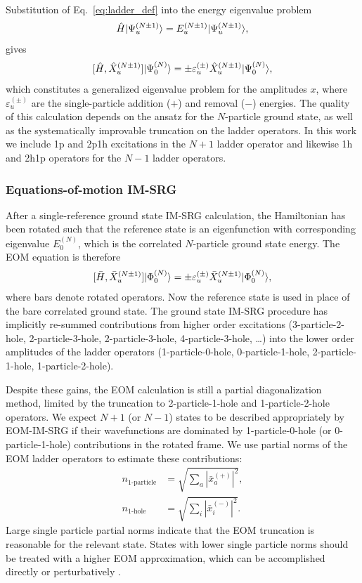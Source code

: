 Substitution of Eq.\ \eqref{eq:ladder_def} into the energy eigenvalue problem
\begin{gather*}
  \hat H | \Psi_u^{(N \pm 1)} \rangle = E^{(N\pm1)}_u | \Psi_u^{(N \pm 1)} \rangle,
\end{gather*}
gives
\begin{equation}\label{eq:EOM}
  [\hat{H}, \hat{X}^{(N \pm 1)}_u] | \Psi^{(N)}_0 \rangle = \pm \varepsilon^{(\pm)}_u \hat{X}^{(N \pm 1)}_u | \Psi^{(N)}_0 \rangle,
\end{equation}
which constitutes a generalized eigenvalue problem for the amplitudes $x$, where $\varepsilon^{(\pm)}_u$ are the single-particle addition ($+$) and removal ($-$) energies. The quality of this calculation depends on the ansatz for the $N$-particle ground state, as well as the systematically improvable truncation on the ladder operators. In this work we include 1p and 2p1h excitations in the $N + 1$ ladder operator and likewise 1h and 2h1p operators for the $N - 1$ ladder operators.

\subsubsection*{Equations-of-motion IM-SRG}

After a single-reference ground state IM-SRG calculation, the Hamiltonian has been rotated such that the reference state is an eigenfunction with corresponding eigenvalue $E^{(N)}_0$, which is the correlated $N$-particle ground state energy. The EOM equation is therefore
\begin{align} \label{eq:EOMIMSRG}
  [\bar{H},\bar{X}^{(N \pm 1)}_u] | \Phi^{(N)}_0 \rangle = \pm \varepsilon^{(\pm)}_u \bar{X}^{(N \pm 1)}_u | \Phi^{(N)}_0 \rangle,
\end{align}
where bars denote rotated operators. Now the reference state is used in place of the bare correlated ground state. The ground state IM-SRG procedure has implicitly re-summed contributions from higher order excitations (3-particle-2-hole, 2-particle-3-hole, 2-particle-3-hole, 4-particle-3-hole, \ldots) into the lower order amplitudes of the ladder operators (1-particle-0-hole, 0-particle-1-hole, 2-particle-1-hole, 1-particle-2-hole).

Despite these gains, the EOM calculation is still a partial diagonalization method, limited by the truncation to 2-particle-1-hole and 1-particle-2-hole operators. We expect $N + 1$ (or $N - 1$) states to be described appropriately by EOM-IM-SRG if their wavefunctions are dominated by 1-particle-0-hole (or 0-particle-1-hole) contributions in the rotated frame. We use partial norms of the EOM ladder operators to estimate these contributions:
\begin{align}
  \label{eq:partial_norms_p}
  n_{\text{1-particle}} &= \sqrt{\sum_a | \bar{x}^{(+)}_a |^2},\\
  \label{eq:partial_norms_h}
  n_{\text{1-hole}} &= \sqrt{\sum_i | \bar{x}^{(-)}_i |^2}.
\end{align}
Large single particle partial norms indicate that the EOM truncation is reasonable for the relevant state. States with lower single particle norms should be treated with a higher EOM approximation, which can be accomplished directly or perturbatively \cite{PhysRevC.95.044304}.

